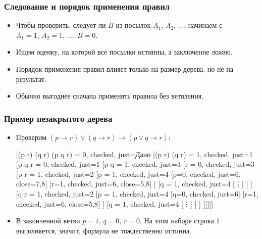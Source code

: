 \documentclass[10pt]{beamer}
\begin{document}


\begin{frame}
\frametitle{Следование и порядок применения правил}
\begin{itemize}
    \item Чтобы проверить, следует ли $B$ из посылок $A_1,\, A_2,\,\ldots$, начинаем с $A_1=1,\, A_2=1,\, \ldots,\, B=0$.
    \item Ищем оценку, на которой все посылки истинны, а заключение ложно.
    \pause
    \item Порядок применения правил влияет только на размер дерева, но не на результат.
    \item Обычно выгоднее сначала применять правила без ветвления.
\end{itemize}
\end{frame}

\begin{frame}
\frametitle{Пример незакрытого дерева}
\begin{itemize}
    \item Проверим $(p \to r) \lor (q \to r) \to (p \lor q \to r)$:
    {\footnotesize
    \begin{tableau}{}
        [{(p \to r) \lor (q \to r) \to (p \lor q \to r) = 0}, checked, just=Дано
        [{(p \to r) \lor (q \to r) = 1}, checked, just=1
        [{p \lor q \to r = 0}, checked, just=1
        [{p \lor q = 1}, checked, just=3
        [{r = 0}, checked, just=3
        [{p \to r = 1}, checked, just=2
        [{p = 1}, checked, just=4
        [{p=0}, checked, just=6, close={7,8}]
        [{r=1}, checked, just=6, close={5,8}]
        ]
        [{q = 1}, checked, just=4
        [\vdots]
        ]
        ]
        [{q \to r = 1}, checked, just=2
        [{p = 1}, checked, just=4
        [{q=0}, checked, just=6]
        [{r=1}, checked, just=6, close={5,8}]
        ]
        [{q = 1}, checked, just=4
        [\vdots]
        ]
        ]
        ]]]]]
    \end{tableau}
    }
    \item В законченной ветви $p=1,\,q=0,\,r=0$. На этом наборе строка 1 выполняется, значит, \pause формула не тождественно истинна.
\end{itemize}
\end{frame}
\end{document}
